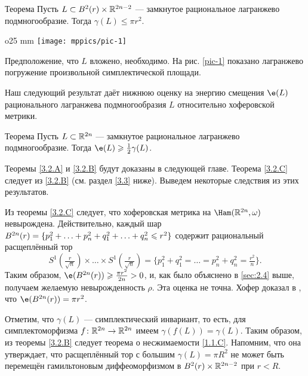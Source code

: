 \begin{thm}[(\cite{S1})]{Теорема}\label{3.2.B}
  Пусть $L \subset B^2 (r) \times \mathbb{R}^{2n - 2}$ --- замкнутое
  рациональное лагранжево подмногообразие. 
  Тогда $\gamma (L) \le \pi r^2$.
\end{thm}

\begin{wrapfigure}[6]{o}{25 mm}
\vskip-3mm
\centering
\texttt{[image: mppics/pic-1]}
\caption{}\label{pic-1}
\vskip0mm
\end{wrapfigure}

Предположение, что $L$ вложено, необходимо.
На рис. \ref{pic-1} показано лагранжево погружение произвольной
симплектической площади.

Наш следующий результат даёт нижнюю оценку на энергию смещения $\e (L)$ рационального лагранжева подмногообразия $L$ относительно хоферовской метрики.

\begin{thm}{Теорема}\label{3.2.C}
  Пусть $L \subset \mathbb{R}^{2n}$ --- замкнутое рациональное лагранжево
  подмногообразие.
  Тогда $\e (L) \ge \tfrac12 \gamma (L)$.
\end{thm}

Теоремы \ref{3.2.A} и \ref{3.2.B} будут доказаны в следующей главе.
Теорема \ref{3.2.C} следует из \ref{3.2.B} (см. раздел \ref{3.3} ниже).
Выведем некоторые следствия из этих результатов.

\begin{thm}{}\label{3.2.D}
\end{thm}

Из теоремы \ref{3.2.C} следует, что хоферовская метрика на $\Ham (\RR^{2n}, \omega)$ невырождена.
Действительно, каждый шар 
$B^{2n}(r) = \{p_1^2 +\z\dots\z+ p_n^2 \z+ q_1^2+\z\dots\z+ q_n^2 \le r^2\}$
содержит рациональный расщеплённый тор 
\[
S^1(\tfrac r{\sqrt{n}}) \times\dots\times S^1(\tfrac r{\sqrt{n}})
=
\{p_1^{2}+q_1^2=\dots=p_n^{2}+q_n^2=\tfrac{r^2}{n}\}.
\]
Таким образом, $\e (B^{2n} (r)) \ge \tfrac{\pi r^2}{2n}> 0$, и, как было объяснено в \ref{sec:2.4} выше, получаем желаемую невырожденность $\rho$.
Эта оценка не точна.
Хофер доказал в \cite{H1}, что $\e (B^{2n} (r)) = \pi r^2$.

\begin{thm}{}\label{3.2.E} 
\end{thm}

Отметим, что $\gamma (L)$ --- симплектический инвариант, то есть, для симплектоморфизма $f\colon \mathbb{R}^{2n} \to \mathbb{R}^{2n}$ имеем $\gamma (f (L)) = \gamma (L)$.
Таким образом, из теоремы \ref{3.2.B} следует теорема о несжимаемости \ref{1.1.C}.
Напомним, что она утверждает, что расщеплённый тор с большим $\gamma (L) = \pi R^2$ не может быть перемещён гамильтоновым диффеоморфизмом в $B^2 (r) \times \mathbb{R}^{2n - 2}$ при $r<R$.

